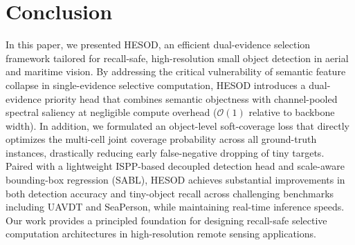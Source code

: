 \section{Conclusion}
\label{sec:conclusion}

In this paper, we presented HESOD, an efficient dual-evidence selection framework tailored for recall-safe, high-resolution small object detection in aerial and maritime vision. By addressing the critical vulnerability of semantic feature collapse in single-evidence selective computation, HESOD introduces a dual-evidence priority head that combines semantic objectness with channel-pooled spectral saliency at negligible compute overhead ($\mathcal{O}(1)$ relative to backbone width). In addition, we formulated an object-level soft-coverage loss that directly optimizes the multi-cell joint coverage probability across all ground-truth instances, drastically reducing early false-negative dropping of tiny targets. Paired with a lightweight ISPP-based decoupled detection head and scale-aware bounding-box regression (SABL), HESOD achieves substantial improvements in both detection accuracy and tiny-object recall across challenging benchmarks including UAVDT and SeaPerson, while maintaining real-time inference speeds. Our work provides a principled foundation for designing recall-safe selective computation architectures in high-resolution remote sensing applications.
